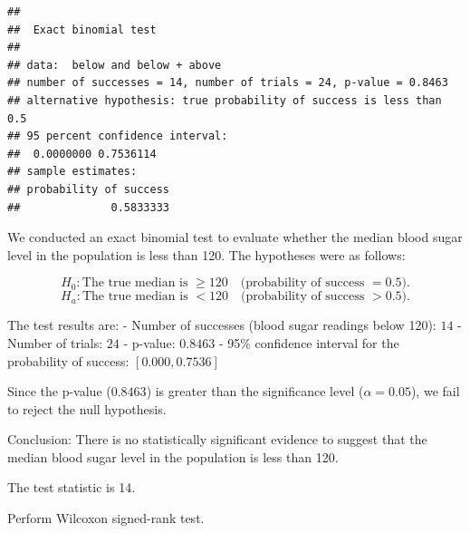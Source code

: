 \documentclass[
]{article}
\begin{document}
\begin{verbatim}
## 
##  Exact binomial test
## 
## data:  below and below + above
## number of successes = 14, number of trials = 24, p-value = 0.8463
## alternative hypothesis: true probability of success is less than 0.5
## 95 percent confidence interval:
##  0.0000000 0.7536114
## sample estimates:
## probability of success 
##              0.5833333
\end{verbatim}

We conducted an exact binomial test to evaluate whether the median blood
sugar level in the population is less than 120. The hypotheses were as
follows:

\[
H_0: \text{The true median is } \geq 120 \quad \text{(probability of success } = 0.5\text{)}.
\] \[
H_a: \text{The true median is } < 120 \quad \text{(probability of success } > 0.5\text{)}.
\]

The test results are: - Number of successes (blood sugar readings below
120): \(14\) - Number of trials: \(24\) - p-value: \(0.8463\) - 95\%
confidence interval for the probability of success: \([0.000, 0.7536]\)

Since the p-value (\(0.8463\)) is greater than the significance level
(\(\alpha = 0.05\)), we fail to reject the null hypothesis.

Conclusion: There is no statistically significant evidence to suggest
that the median blood sugar level in the population is less than 120.

The test statistic is 14.

Perform Wilcoxon signed-rank test.
\end{document}
